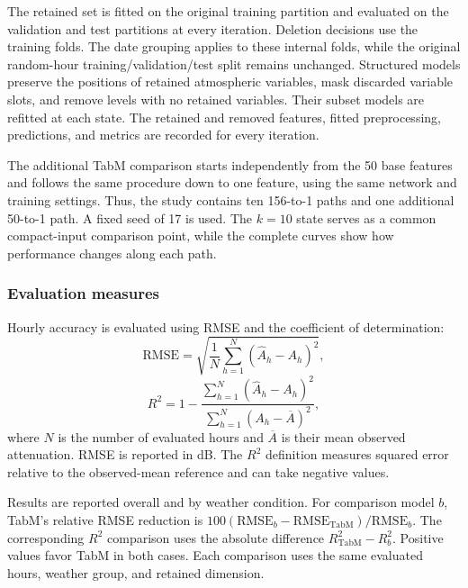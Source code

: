 The retained set is fitted on the original training partition and evaluated on the validation and test partitions at every iteration. Deletion decisions use the training folds. The date grouping applies to these internal folds, while the original random-hour training/validation/test split remains unchanged. Structured models preserve the positions of retained atmospheric variables, mask discarded variable slots, and remove levels with no retained variables. Their subset models are refitted at each state. The retained and removed features, fitted preprocessing, predictions, and metrics are recorded for every iteration.

The additional TabM comparison starts independently from the 50 base features and follows the same procedure down to one feature, using the same network and training settings. Thus, the study contains ten 156-to-1 paths and one additional 50-to-1 path. A fixed seed of 17 is used. The $k=10$ state serves as a common compact-input comparison point, while the complete curves show how performance changes along each path.

\subsubsection{Evaluation measures}

Hourly accuracy is evaluated using RMSE and the coefficient of determination:
\begin{equation}
\mathrm{RMSE}
=
\sqrt{
\frac{1}{N}
\sum_{h=1}^{N}
\left(\widehat{A}_h-A_h\right)^2
},
\label{eq:hourly_rmse}
\end{equation}
\begin{equation}
R^2
=
1-
\frac{
\sum_{h=1}^{N}
\left(\widehat{A}_h-A_h\right)^2
}{
\sum_{h=1}^{N}
\left(A_h-\overline{A}\right)^2
},
\label{eq:hourly_r2}
\end{equation}
where $N$ is the number of evaluated hours and $\overline{A}$ is their mean observed attenuation. RMSE is reported in dB. The $R^2$ definition measures squared error relative to the observed-mean reference and can take negative values.

Results are reported overall and by weather condition. For comparison model $b$, TabM's relative RMSE reduction is $100(\mathrm{RMSE}_{b}-\mathrm{RMSE}_{\mathrm{TabM}})/\mathrm{RMSE}_{b}$. The corresponding $R^2$ comparison uses the absolute difference $R^2_{\mathrm{TabM}}-R^2_b$. Positive values favor TabM in both cases. Each comparison uses the same evaluated hours, weather group, and retained dimension.

